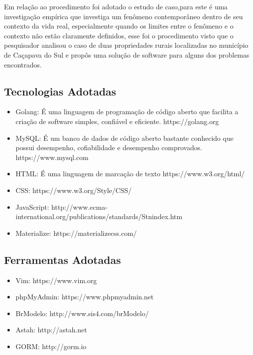 \documentclass[12pt]{article}
\begin{document}
\begin{titlepage}
	Em relação ao procedimento foi adotado o estudo de caso,para  este é uma investigação empírica que investiga um fenômeno contemporâneo dentro de seu contexto da vida real, especialmente quando os limites entre o fenômeno e o contexto não estão claramente definidos, esse foi o procedimento visto que o pesquisador analisou o caso de duas propriedades rurais localizadas no município de Caçapava do Sul e propôs uma solução de software para alguns dos problemas encontrados.


	\subsection{Tecnologias Adotadas}

	\begin{itemize}
		\item Golang: É uma linguagem de programação de código aberto que facilita a criação de software simples, confiável e eficiente. https://golang.org	
		\item MySQL: É um banco de dados de código aberto bastante conhecido que possui desempenho, cofiabilidade e desempenho comprovados. https://www.mysql.com
		\item HTML: É uma linguagem de marcação de texto  https://www.w3.org/html/
		\item CSS: https://www.w3.org/Style/CSS/
		\item JavaScript: http://www.ecma-international.org/publications/standards/Stnindex.htm
		\item Materialize: https://materializecss.com/
	\end{itemize}

	\subsection{Ferramentas Adotadas}

	\begin{itemize}
		\item Vim: https://www.vim.org
		\item phpMyAdmin: https://www.phpmyadmin.net
		\item BrModelo: http://www.sis4.com/brModelo/
		\item Astah: http://astah.net
		\item GORM: http://gorm.io
	\end{itemize}

	\newpage


\end{titlepage}
\end{document}

